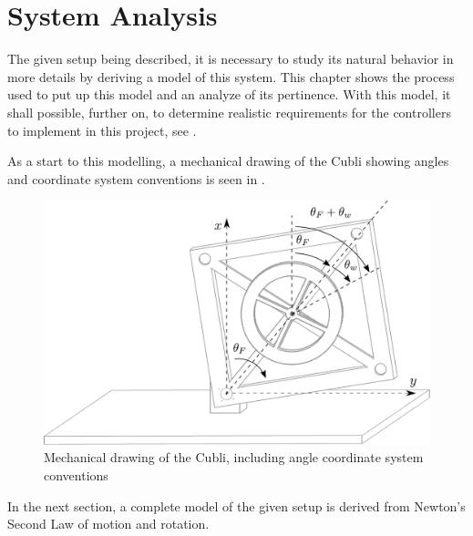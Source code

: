 \chapter{System Analysis}
The given setup being described, it is necessary to study its natural behavior in more details by deriving a model of this system. This chapter shows the process used to put up this model and an analyze of its pertinence. With this model, it shall possible, further on, to determine realistic requirements for the controllers to implement in this project, see .

As a start to this modelling, a mechanical drawing of the Cubli showing angles and coordinate system conventions is seen in .

\begin{figure}[H]
 \centering
 \includegraphics[scale=0.6]{figures/mechanicalSystem}
 \caption{Mechanical drawing of the Cubli, including angle coordinate system conventions}
 \label{cubliMechanical}
\end{figure}

In the next section, a complete model of the given setup is derived from Newton's Second Law of motion and rotation.